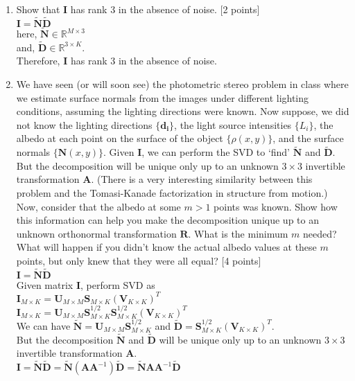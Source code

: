 \documentclass[11pt]{article}
\begin{document}
\begin{enumerate} 
\item Show that $\mathbf{I}$ has rank 3 in the absence of noise. \textsf{[2 points]} \\

$\mathbf{I} = \mathbf{\tilde{N}} \mathbf{\tilde{D}}$ \\
here, $\mathbf{\tilde{N}} \in \mathbb{R}^{M \times 3}$ \\
and, $\mathbf{\tilde{D}} \in \mathbb{R}^{3 \times K}$. \\

Therefore,
$\mathbf{I}$ has rank 3 in the absence of noise. \\

\item We have seen (or will soon see) the photometric stereo problem in class where we estimate surface normals from the images under different lighting conditions, assuming the lighting directions were known. Now suppose, we did not know the lighting directions $\{\mathbf{d_i}\}$, the light source intensities $\{L_i\}$, the albedo at each point on the surface of the object $\{\rho(x,y)\}$, and the surface normals $\{\mathbf{N}(x,y)\}$. Given $\mathbf{I}$, we can perform the SVD to `find' $\mathbf{\tilde{N}}$ and $\mathbf{\tilde{D}}$. But the decomposition will be unique only up to an unknown $3 \times 3$ invertible transformation $\mathbf{A}$. (There is a very interesting similarity between this problem and the Tomasi-Kanade factorization in structure from motion.) Now, consider that the albedo at some $m > 1$ points was known. Show how this information can help you make the decomposition unique up to an unknown orthonormal transformation $\mathbf{R}$. What is the minimum $m$ needed? What will happen if you didn't know the actual albedo values at these $m$ points, but only knew that they were all equal? \textsf{[4 points]} \\

$\mathbf{I} = \mathbf{\tilde{N}} \mathbf{\tilde{D}}$ \\
Given matrix $\mathbf{I}$, perform SVD as \\
$\mathbf{I}_{M \times K} = \mathbf{U}_{M \times M} \mathbf{S}_{M \times K} (\mathbf{V}_{K \times K})^T$ \\
$\mathbf{I}_{M \times K} = \mathbf{U}_{M \times M} \mathbf{S}_{M \times K}^{1/2} \mathbf{S}_{M \times K}^{1/2} (\mathbf{V}_{K \times K})^T$ \\
We can have $\mathbf{\tilde{N}} = \mathbf{U}_{M \times M} \mathbf{S}_{M \times K}^{1/2} $ and $ \mathbf{\tilde{D}} = \mathbf{S}_{M \times K}^{1/2} (\mathbf{V}_{K \times K})^T$. \\
But the decomposition $\mathbf{\tilde{N}}$ and $\mathbf{\tilde{D}}$ will be unique only up to an unknown $3 \times 3$ invertible transformation $\mathbf{A}$.\\
$\mathbf{I} = \mathbf{\tilde{N}} \mathbf{\tilde{D}} = \mathbf{\tilde{N}} (\mathbf{AA}^{-1})\mathbf{\tilde{D}} = \mathbf{\tilde{N}} \mathbf{AA}^{-1}\mathbf{\tilde{D}}$\\


\end{enumerate}
\end{document}
